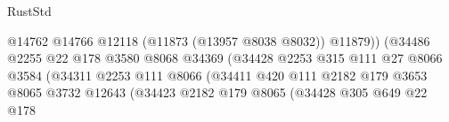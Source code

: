 \begin{lexlean}{RustStd}
\begin{coremodule}
                                                        @14762
                                                        @14766
                                                        @12118
                                                        (@11873 (@13957 @8038 @8032))
                                                        @11879))
                                                    (@34486
                                                      @2255
                                                      @22
                                                      @178
                                                      @3580
                                                      @8068
                                                      @34369
                                                      (@34428
                                                        @2253
                                                        @315
                                                        @111
                                                        @27
                                                        @8066
                                                        @3584
                                                        (@34311
                                                          @2253
                                                          @111
                                                          @8066
                                                          (@34411
                                                            @420
                                                            @111
                                                            @2182
                                                            @179
                                                            @3653
                                                            @8065
                                                            @3732
                                                            @12643
                                                            (@34423
                                                              @2182
                                                              @179
                                                              @8065
                                                              (@34428
                                                                @305
                                                                @649
                                                                @22
                                                                @178

\end{coremodule}
\end{lexlean}
